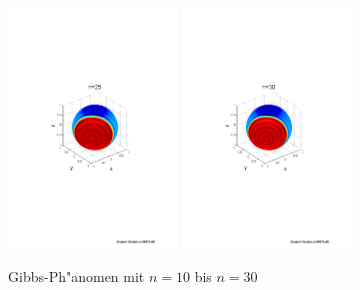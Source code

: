 \begin{refsection}
\begin{figure}
\includegraphics[width=0.4\textwidth]{kugel/Gibbs/GibbsN_25.pdf}
\includegraphics[width=0.4\textwidth]{kugel/Gibbs/GibbsN_30.pdf}
\caption{Gibbs-Ph"anomen mit $n=10$ bis $n=30$
\label{skript:Gibbs2}}
\end{figure}

\printbibliography[heading=subbibliography]
\end{refsection}

